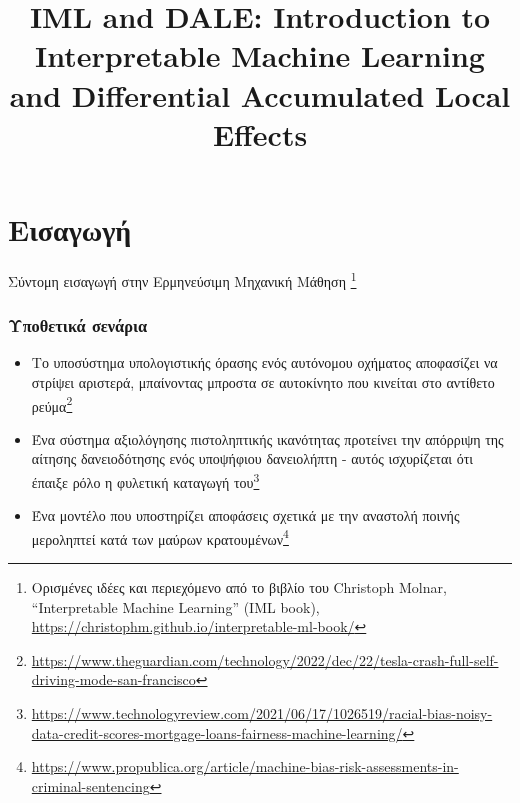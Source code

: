 



\title{\Large{IML and DALE: Introduction to Interpretable Machine
  Learning and Differential Accumulated Local Effects}}




\frame{\titlepage}


\section{Εισαγωγή}

\begin{frame}[plain,c]
  \Large Σύντομη εισαγωγή στην Ερμηνεύσιμη Μηχανική Μάθηση \footnote{Ορισμένες ιδέες και περιεχόμενο από το βιβλίο του
  Christoph Molnar, ``Interpretable Machine Learning'' (IML book),
  \url{https://christophm.github.io/interpretable-ml-book/}}
\end{frame}

\begin{frame}
  \frametitle{Υποθετικά σενάρια}

  \begin{itemize}
  \item<1-> Το υποσύστημα υπολογιστικής όρασης ενός αυτόνομου οχήματος αποφασίζει
    να στρίψει αριστερά, μπαίνοντας μπροστα σε αυτοκίνητο που κινείται στο
    αντίθετο
    ρεύμα\footnote{\url{https://www.theguardian.com/technology/2022/dec/22/tesla-crash-full-self-driving-mode-san-francisco}}
  \item<2-> Ένα σύστημα αξιολόγησης πιστοληπτικής ικανότητας προτείνει την
    απόρριψη της αίτησης δανειοδότησης ενός υποψήφιου
    δανειολήπτη - αυτός ισχυρίζεται ότι έπαιξε ρόλο η φυλετική καταγωγή του\footnote{\url{https://www.technologyreview.com/2021/06/17/1026519/racial-bias-noisy-data-credit-scores-mortgage-loans-fairness-machine-learning/}}
  \item<3-> Ένα μοντέλο που υποστηρίζει αποφάσεις σχετικά με την αναστολή ποινής
    μεροληπτεί κατά των μαύρων
    κρατουμένων\footnote{\url{https://www.propublica.org/article/machine-bias-risk-assessments-in-criminal-sentencing}}
  \end{itemize}

\end{frame}


